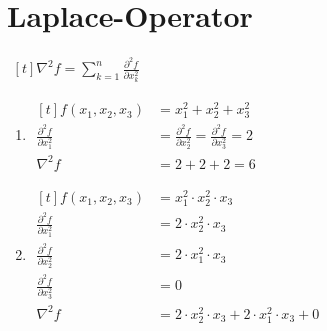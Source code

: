 \setcounter{section}{2}
\section{Laplace-Operator}

$\begin{aligned}[t]
		\nabla ^ 2 f = \sum_{k=1}^n \frac{\partial^2 f}{\partial x^2_k}
	\end{aligned}$

\begin{enumerate}
	\setlength\itemsep{2em}
	\item
	      $
		      \begin{aligned}[t]
			      f(x_1,x_2,x_3)                      & = x_1^2 + x_2^2 + x_3^2 \\
			      \frac{\partial^2 f}{\partial x^2_1} &
			      = \frac{\partial^2 f}{\partial x^2_2}
			      = \frac{\partial^2 f}{\partial x^2_3} = 2                     \\
			      \nabla ^ 2 f                        & = 2 + 2 + 2 =  6
		      \end{aligned}
	      $

	\item
	      $
		      \begin{aligned}[t]
			      f(x_1,x_2,x_3)                      & = x_1^2 \cdot x_2^2 \cdot x_3                           \\
			      \frac{\partial^2 f}{\partial x^2_1} & = 2 \cdot x_2^2 \cdot x_3                               \\
			      \frac{\partial^2 f}{\partial x^2_2} & = 2 \cdot x_1^2 \cdot x_3                               \\
			      \frac{\partial^2 f}{\partial x^2_3} & = 0                                                     \\
			      \nabla ^ 2 f                        & = 2 \cdot x_2^2 \cdot x_3 + 2 \cdot x_1^2 \cdot x_3 + 0
		      \end{aligned}
	      $
\end{enumerate}